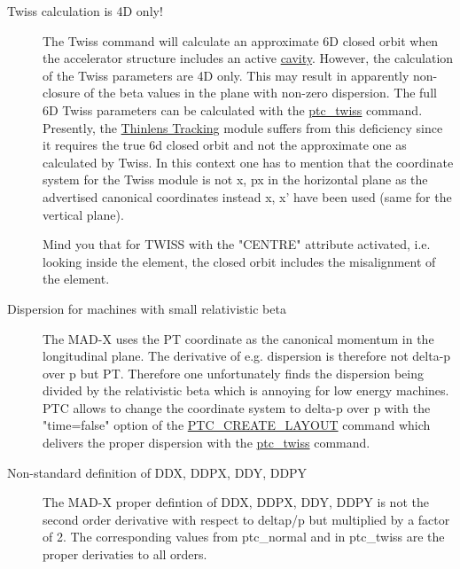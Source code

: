 \begin{description}
	\item[Twiss calculation is 4D only!] 

      The Twiss command will calculate an approximate 6D closed orbit when     the accelerator structure includes an active \href{../Introduction/cavity.html}{cavity}. However, the calculation     of the Twiss parameters are 4D only. This may result in apparently     non-closure of the beta values in the plane with non-zero     dispersion. The full 6D Twiss parameters can be calculated with the \href{../ptc_twiss/ptc_twiss.html}{ptc\_twiss} command. Presently, the \href{../thintrack/thintrack.html}{Thinlens Tracking} module     suffers from this deficiency since it requires the true 6d closed     orbit and not the approximate one as calculated by Twiss. In this     context one has to mention that the coordinate system for the Twiss     module is not x, px in the horizontal plane as the advertised     canonical coordinates instead x, x' have been used (same for the     vertical plane). 

      Mind you that for TWISS with the "CENTRE" attribute activated, i.e. looking     inside the element, the closed orbit includes the misalignment of the element. 
\end{description}
\begin{description}
	\item[Dispersion for machines with small relativistic beta] 

     The MAD-X uses the PT coordinate as the canonical momentum in the     longitudinal plane. The derivative of e.g. dispersion is therefore not     delta-p over p but PT. Therefore one unfortunately finds the     dispersion being divided by the relativistic beta which is annoying     for low energy machines. PTC allows to change the coordinate system to     delta-p over p with the "time=false" option of the \href{../ptc_general/ptc_general.html#PTC_CREATE_LAYOUT}{PTC\_CREATE\_LAYOUT}     command which delivers the proper dispersion with the \href{../ptc_twiss/ptc_twiss.html}{ptc\_twiss} command. 
\end{description}
\begin{description}
	\item[Non-standard definition of DDX, DDPX, DDY, DDPY] 

     The MAD-X proper defintion of DDX, DDPX, DDY, DDPY is not the     second order derivative with respect to deltap/p but multiplied by     a factor of 2. The corresponding values from ptc\_normal and in     ptc\_twiss are the proper derivaties to all orders. 
\end{description}
